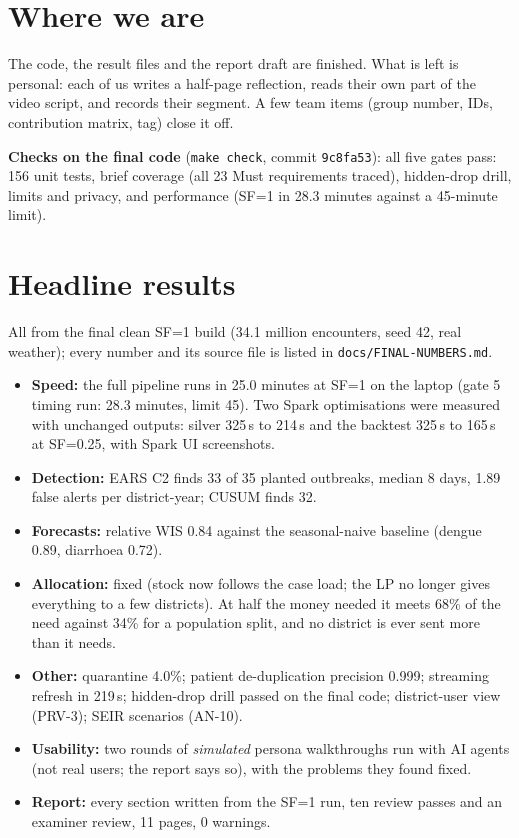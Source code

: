 
\section*{Where we are}
The code, the result files and the report draft are finished. What is left is personal: each of us writes a
half-page reflection, reads their own part of the video script, and records their segment. A few team items
(group number, IDs, contribution matrix, tag) close it off.

\textbf{Checks on the final code} (\texttt{make check}, commit \texttt{9c8fa53}):
all five gates pass: 156 unit tests, brief coverage (all 23 Must requirements traced), hidden-drop drill, limits and privacy, and performance (SF=1 in 28.3 minutes against a 45-minute limit).

\section*{Headline results}
All from the final clean SF=1 build (34.1 million encounters, seed 42, real weather); every number and its
source file is listed in \nolinkurl{docs/FINAL-NUMBERS.md}.
\begin{itemize}
\item \textbf{Speed:} the full pipeline runs in 25.0 minutes at SF=1 on the laptop (gate 5 timing run: 28.3
minutes, limit 45). Two Spark optimisations were measured with unchanged outputs: silver 325\,s to 214\,s and
the backtest 325\,s to 165\,s at SF=0.25, with Spark UI screenshots.
\item \textbf{Detection:} EARS C2 finds 33 of 35 planted outbreaks, median 8 days, 1.89 false alerts per
district-year; CUSUM finds 32.
\item \textbf{Forecasts:} relative WIS 0.84 against the seasonal-naive baseline (dengue 0.89, diarrhoea 0.72).
\item \textbf{Allocation:} fixed (stock now follows the case load; the LP no longer gives everything to a few
districts). At half the money needed it meets 68\% of the need against 34\% for a population split, and no district is ever sent more than it needs.
\item \textbf{Other:} quarantine 4.0\%; patient de-duplication precision 0.999; streaming refresh in 219\,s;
hidden-drop drill passed on the final code; district-user view (PRV-3); SEIR scenarios (AN-10).
\item \textbf{Usability:} two rounds of \emph{simulated} persona walkthroughs run with AI agents (not real
users; the report says so), with the problems they found fixed.
\item \textbf{Report:} every section written from the SF=1 run, ten review passes and an examiner review, 11 pages, 0 warnings.
\end{itemize}

